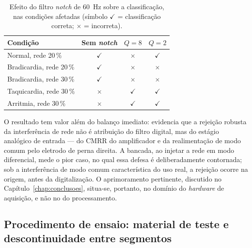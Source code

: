 \begin{table}[htb]
\centering
\caption{Efeito do filtro \textit{notch} de 60~Hz sobre a classificação, nas condições afetadas (símbolo $\checkmark$ = classificação correta; $\times$ = incorreta).}
\label{tab:notchAB}
\begin{tabular}{l c c c}
\hline
\textbf{Condição} & \textbf{Sem \textit{notch}} & \textbf{$Q=8$} & \textbf{$Q=2$} \\
\hline
Normal, rede 20\,\%     & $\checkmark$ & $\times$      & $\checkmark$ \\
Bradicardia, rede 20\,\%& $\checkmark$ & $\times$      & $\times$     \\
Bradicardia, rede 30\,\%& $\checkmark$ & $\times$      & $\times$     \\
Taquicardia, rede 30\,\%& $\times$     & $\checkmark$  & $\checkmark$ \\
Arritmia, rede 30\,\%   & $\times$     & $\checkmark$  & $\checkmark$ \\
\hline
\end{tabular}
\end{table}

O resultado tem valor além do balanço imediato: evidencia que a rejeição robusta da interferência de rede não é atribuição do filtro digital, mas do estágio analógico de entrada — do \acs{CMRR} do amplificador e da realimentação de modo comum pelo eletrodo de perna direita. A bancada, ao injetar a rede em modo diferencial, mede o pior caso, no qual essa defesa é deliberadamente contornada; sob a interferência de modo comum característica do uso real, a rejeição ocorre na origem, antes da digitalização. O aprimoramento pertinente, discutido no Capítulo~\ref{chap:conclusoes}, situa-se, portanto, no domínio do \textit{hardware} de aquisição, e não no do processamento.

\subsection{Procedimento de ensaio: material de teste e descontinuidade entre segmentos}
\label{sec:resProcedimento}

